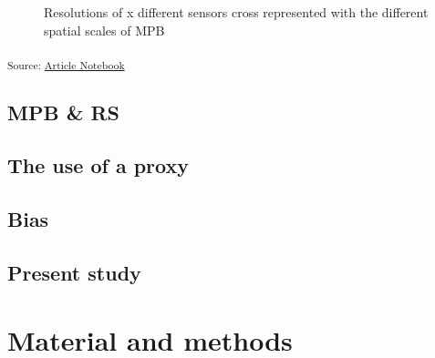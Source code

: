 \documentclass[
  letterpaper,
  DIV=11,
  numbers=noendperiod]{scrartcl}
\begin{document}
\label{cell-fig-resolutions}
\begin{figure}[H]


\caption{\label{fig-resolutions}Resolutions of x different sensors cross
represented with the different spatial scales of MPB}

\end{figure}%

\textsubscript{Source:
\href{https://AugustinDebly.github.io/Scaling_bias/index.qmd.html}{Article
Notebook}}

\subsection{MPB \& RS}\label{mpb-rs}

\subsection{The use of a proxy}\label{the-use-of-a-proxy}

\subsection{Bias}\label{bias}

\subsection{Present study}\label{present-study}

\section{Material and methods}\label{material-and-methods}
\end{document}
